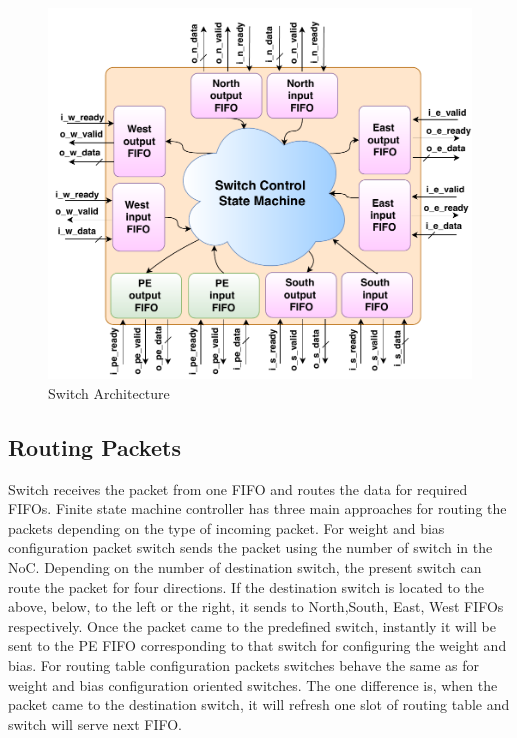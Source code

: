\begin{figure}
    \includegraphics[width=\columnwidth]{Figures/switch2.pdf}
    \caption{Switch Architecture} 
    \label{figure:switch_architecture}
\end{figure}

\subsection{Routing Packets}
 Switch receives the packet from one FIFO and routes the data for required FIFOs. Finite state machine controller has three main approaches for routing the packets depending on the type of incoming packet.
 For weight and bias configuration packet switch sends the packet using the number of switch in the NoC. Depending on the number of destination switch, the present switch can route the packet for four directions. If the destination switch is located to the above, below, to the left or the right, it sends to North,South, East, West FIFOs respectively. Once the packet came to the predefined switch, instantly it will be sent to the PE FIFO corresponding to that switch for configuring the weight and bias.   
For routing table configuration packets switches behave the same as for weight and bias configuration oriented switches. The one difference is, when the packet came to the destination switch, it will refresh one slot of routing table and switch will serve next FIFO. 

